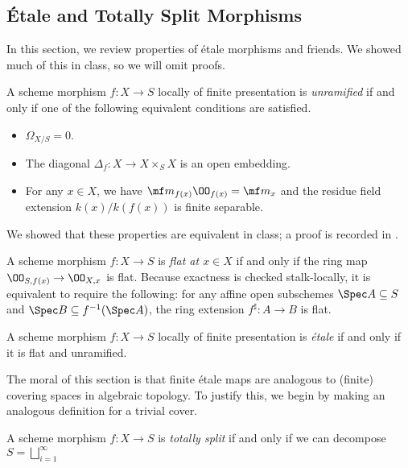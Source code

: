 \documentclass{amsart}
\begin{document}
\subsection{\'Etale and Totally Split Morphisms}
In this section, we review properties of \'etale morphisms and friends. We showed much of this in class, so we will omit proofs.
\begin{definition}[unramified]
    A scheme morphism $f\colon X\to S$ locally of finite presentation is \textit{unramified} if and only if one of the following equivalent conditions are satisfied.
    \begin{itemize}
        \item $\Omega_{X/S}=0$.
        \item The diagonal $\Delta_f\colon X\to X\times_SX$ is an open embedding.
        \item For any $x\in X$, we have $\mf m_{f(x)}\OO_{f(x)}=\mf m_x$ and the residue field extension $k(x)/k(f(x))$ is finite separable.
    \end{itemize}
\end{definition}
We showed that these properties are equivalent in class; a proof is recorded in \cite[\href{https://stacks.math.columbia.edu/tag/02GF}{Lemma 02GF}]{stacks}.
\begin{definition}[flat]
    A scheme morphism $f\colon X\to S$ is \textit{flat at $x\in X$} if and only if the ring map $\OO_{S,f(x)}\to\OO_{X,x}$ is flat. Because exactness is checked stalk-locally, it is equivalent to require the following: for any affine open subschemes $\Spec A\subseteq S$ and $\Spec B\subseteq f^{-1}(\Spec A)$, the ring extension $f^\sharp\colon A\to B$ is flat.
\end{definition}
\begin{definition}[\'etale]
    A scheme morphism $f\colon X\to S$ locally of finite presentation is \textit{\'etale} if and only if it is flat and unramified.
\end{definition}
The moral of this section is that finite \'etale maps are analogous to (finite) covering spaces in algebraic topology. To justify this, we begin by making an analogous definition for a trivial cover.
\begin{definition}
    A scheme morphism $f\colon X\to S$ is \textit{totally split} if and only if we can decompose $S=\bigsqcup_{i=1}^\infty$
\end{definition}
\todo{}
\end{document}
